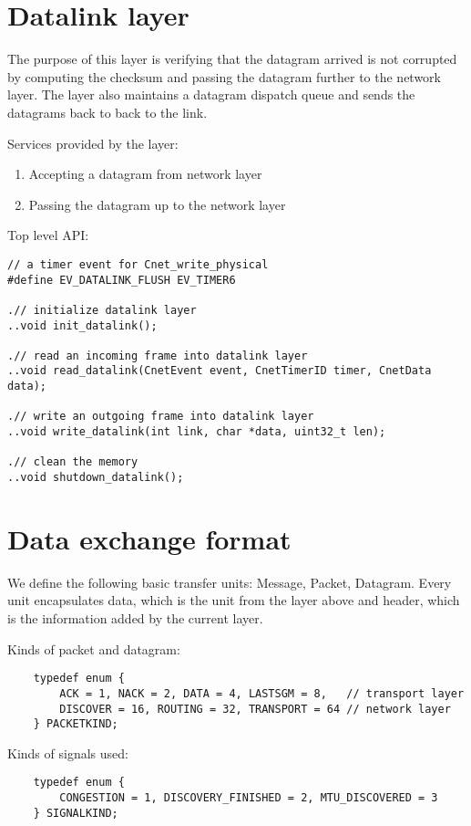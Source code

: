 \documentclass[11pt,a4paper,oneside]{report}
\begin{document}
\section*{Datalink layer}
The purpose of this layer is verifying that the datagram arrived is not
corrupted by computing the checksum and passing the datagram further to
the network layer. The layer also maintains a datagram dispatch queue
and sends the datagrams back to back to the link.

    Services provided by the layer:
    \begin{enumerate}
      \item Accepting a datagram from network layer
      \item Passing the datagram up to the network layer
    \end{enumerate}
    \newpage
    Top level API:
  \begin{lstlisting}
// a timer event for Cnet_write_physical
#define EV_DATALINK_FLUSH EV_TIMER6

.// initialize datalink layer
..void init_datalink();

.// read an incoming frame into datalink layer
..void read_datalink(CnetEvent event, CnetTimerID timer, CnetData data);

.// write an outgoing frame into datalink layer
..void write_datalink(int link, char *data, uint32_t len);

.// clean the memory
..void shutdown_datalink();
  \end{lstlisting}

\section*{Data exchange format}

We define the following basic transfer units: Message, Packet, Datagram.
Every unit encapsulates data, which is the unit from the layer above and header,
which is the information added by the current layer.

Kinds of packet and datagram:

    \begin{lstlisting}
    typedef enum {
        ACK = 1, NACK = 2, DATA = 4, LASTSGM = 8,   // transport layer
        DISCOVER = 16, ROUTING = 32, TRANSPORT = 64 // network layer
    } PACKETKIND;
    \end{lstlisting}

Kinds of signals used:

    \begin{lstlisting}
    typedef enum {
        CONGESTION = 1, DISCOVERY_FINISHED = 2, MTU_DISCOVERED = 3
    } SIGNALKIND;
    \end{lstlisting}
\end{document}
